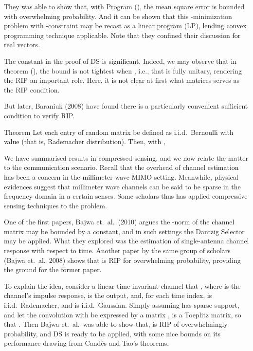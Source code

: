 They was able to show that, with Program (), the mean square error is bounded with overwhelming probability.
And it can be shown that this -minimization problem with \m{\ell_\infty}-constraint may be recast as a linear program (LP), lending convex programming technique applicable.
Note that they confined their discussion for real vectors.

\stopsection
\startsection [title={Sufficient Conditions of RIP}]

The constant \m{\d} in the proof of DS is significant.
Indeed, we may observe that in theorem (), the bound is not tightest when , i.e., that  is fully unitary, rendering the RIP an important role.
Here, it is not clear at first what matrices serves as the RIP condition.

But later, Baraniuk (2008) have found there is a particularly convenient sufficient condition to verify RIP.

\Result
{Theorem}
{
Let each entry of random matrix  be defined as i.i.d.\ Bernoulli with value  (that is, Rademacher distribution).
Then, with ,
%
}

\color[red] {(To be done)}

\stopsection
\startsection [title={Compressed Channel Sensing}]

We have summarised results in compressed sensing, and we now relate the matter to the communication scenario.
Recall that the overhead of channel estimation has been a concern in the millimeter wave MIMO setting.
Meanwhile, physical evidences suggest that millimeter wave channels can be said to be sparse in the frequency domain in a certain senses.
Some scholars thus has applied compressive sensing techniques to the problem.

One of the first papers, Bajwa et.\ al.\ (2010) argues the -norm of the channel matrix may be bounded by a constant, and in such settings the Dantzig Selector may be applied.
What they explored was the estimation of single-antenna channel response with respect to time.
Another paper by the same group of scholars (Bajwa et.\ al.\ 2008) shows that  is RIP for overwhelming probability, providing the ground for the former paper.

To explain the idea, consider a linear time-invariant channel that , where  is the channel's impulse response,  is the output, and, for each time index,  is i.i.d.\ Rademacher, and  is i.i.d.\ Gaussian.
Simply assuming  has sparse support, and let the convolution with  be expressed by a matrix ,  is a Toeplitz matrix, so that .
Then Bajwa et.\ al.\ was able to show that,  is RIP of overwhelmingly probability, and DS is ready to be applied, with some nice bounds on its performance drawing from Cand\`es and Tao's theorems.

